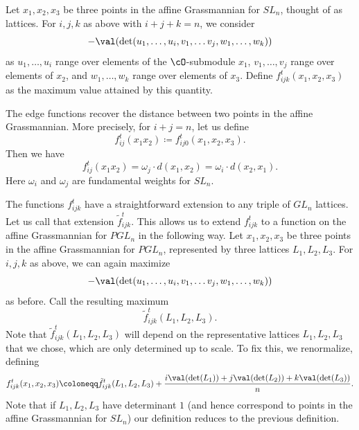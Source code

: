 Let $x_1, x_2, x_3$ be three points in the affine Grassmannian for $SL_n$, thought of as lattices. For $i, j, k$ as above with $i+j+k=n$, we consider
\[
-\val(\det(u_1, \dots, u_i, v_1, \dots v_j, w_1, \dots, w_k))
\]
as $u_1, \dots, u_i$ range over elements of the $\cO$-submodule $x_1$, $v_1, \dots, v_j$ range over elements of $x_2$, and $w_1, \dots, w_k$ range over elements of $x_3$. Define $f_{ijk}^t (x_1,x_2,x_3)$ as the maximum value attained by this quantity.

\begin{rema} The edge functions recover the distance between two points in the affine Grassmannian. More precisely, for $i+j=n$, let us define
\[
f^t_{ij}(x_1x_2) \coloneqq  f_{ij0}^t (x_1,x_2,x_3).
\]
Then we have
\[
f^t_{ij}(x_1x_2) = \omega_j \cdot d(x_1,x_2) = \omega_i \cdot d(x_2,x_1).
\]
 Here $\omega_i$ and $\omega_j$ are fundamental weights for $SL_n$.
\end{rema}


The functions $f_{ijk}^t$ have a straightforward extension to any triple of $GL_n$ lattices. Let us call that extension $\tilde{f}_{ijk}^t.$ This allows us to extend $f_{ijk}^t$ to a function on the affine Grassmannian for $PGL_n$ in the following way. Let $x_1, x_2, x_3$ be three points in the affine Grassmannian for $PGL_n$, represented by three lattices $L_1, L_2, L_3$. For $i, j, k$ as above, we can again maximize
\[
-\val(\det(u_1, \dots, u_i, v_1, \dots v_j, w_1, \dots, w_k))
\]
as before. Call the resulting maximum
\[
\tilde{f}_{ijk}^t (L_1,L_2,L_3).
\]
 Note that $\tilde{f}_{ijk}^t (L_1,L_2,L_3)$ will depend on the representative lattices $L_1, L_2, L_3$ that we chose, which are only determined up to scale. To fix this, we renormalize, defining
\begin{equation} \label{PGLfunction}
f_{ijk}^t (x_1,x_2,x_3) \coloneqq  \tilde{f}_{ijk}^t (L_1,L_2,L_3) + \frac{i\val(\det(L_1)) + j\val(\det(L_2)) + k\val(\det(L_3))}{n}.
\end{equation}
Note that if $L_1, L_2, L_3$ have determinant $1$ (and hence correspond to points in the affine Grassmannian for $SL_n$) our definition reduces to the previous definition.

